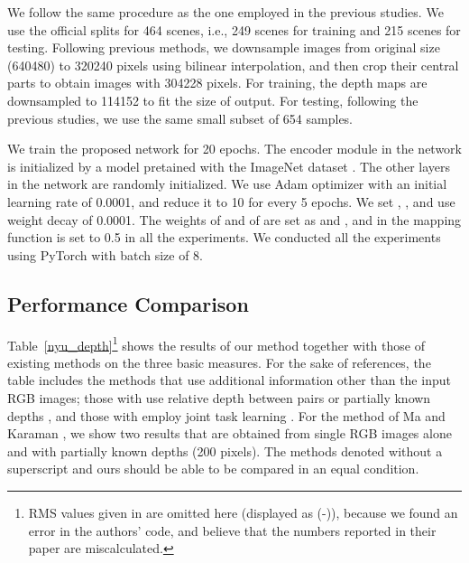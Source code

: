 \documentclass[10pt,twocolumn,letterpaper]{article}
\begin{document}
We follow the same procedure as the one employed in the previous studies.
We use the official splits for 464 scenes, i.e., 249 scenes for training and 215 scenes for testing. 
Following previous methods, we downsample images from original size (640480) to 320240 pixels using bilinear interpolation, and then crop their central parts to obtain images with 304228 pixels.  For training, the depth maps are downsampled to 114152 to fit the size of output. 
For testing, following the previous studies, we use the same small subset of 654 samples. 

We train the proposed network for 20 epochs. The encoder module in the network is initialized by a model pretained with the ImageNet dataset \cite{deng2009imagenet}. The other layers in the network are randomly initialized. 
We use Adam optimizer with an initial learning rate of 0.0001, and reduce it to 10 for every 5 epochs. We set , , and use weight decay of 0.0001.
The weights  of  and  of  are set as  and , and  in the mapping function is set to 0.5 in all the experiments. 
We conducted all the experiments using PyTorch \cite{paszke2017automatic} with batch size of 8. 




\subsection{Performance Comparison}
Table~\ref{nyu_depth}\footnote{RMS values given in \cite{ma2017sparse} are omitted here (displayed as (-)), because we found an error in the authors' code, and believe that the numbers reported in their paper are miscalculated.} shows the results of our method together with those of existing methods on the three basic measures. For the sake of references, the table includes the methods  that use additional information other than the input RGB images; those with  use relative depth between pairs or partially known depths \cite{chen2016single,ma2017sparse},
and those with   employ joint task learning \cite{ladicky2014pulling,wang2015towards,Li2015DepthAS,Eigen2015PredictingDS,Dharmasiri2017JointPO,xu2018pad}. For the method of Ma and Karaman \cite{ma2017sparse}, we show two results that are obtained from single RGB images alone and with partially known depths (200 pixels). The methods denoted without a superscript \cite{Eigen2014depth,laina2016deeper,Xu2017MultiscaleCC,liu2015deep,cao2017estimating,chakrabarti2016depth,li2017two,lee2018single,qi2018geonet,fu2018deep} and ours should be able to be compared in an equal condition. 
\end{document}
